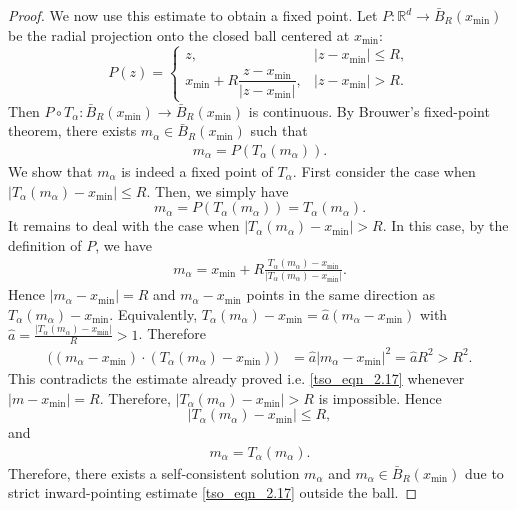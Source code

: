 \documentclass[10pt,a4paper]{amsart}
\begin{document}
\begin{proof}
We now use this estimate to obtain a fixed point. Let
$P:\mathbb R^d\to \bar{B}_R(x_{\min})$ be the radial projection onto
the closed ball centered at $x_{\min}$:
\begin{equation*}
    P(z)
    =
    \begin{cases}
    z, & |z-x_{\min}|\le R,\\
    x_{\min}     +     R\dfrac{z-x_{\min}}{|z-x_{\min}|},
    & |z-x_{\min}|>R.
    \end{cases}
\end{equation*}
Then $ P\circ T_\alpha:
    \bar{B}_R(x_{\min})
    \to     \bar{B}_R(x_{\min}) $ is continuous. By Brouwer's fixed-point theorem, there exists
$m_\alpha\in \bar{B}_R(x_{\min})$ such that
\begin{align*}
    m_\alpha=P(T_\alpha(m_\alpha)).
\end{align*}
We show  that $m_\alpha$ is indeed a fixed point of $T_\alpha$.
First consider the case when $|T_\alpha(m_\alpha)-x_{\min}|\le R$. Then, we simply have 
\begin{equation*}
    m_\alpha = P(T_\alpha(m_\alpha)) =     T_\alpha(m_\alpha).
\end{equation*}
It remains to deal with the case when $|T_\alpha(m_\alpha)-x_{\min}|>R$. 
In this case, by the definition of $P$, we have
\begin{align*}
     m_\alpha
    =  x_{\min} + R\frac{
        T_\alpha(m_\alpha)-x_{\min}}{|T_\alpha(m_\alpha)-x_{\min}|}.
\end{align*}
Hence $|m_\alpha-x_{\min}|=R$ and $m_\alpha-x_{\min}$ points in the same direction as
$T_\alpha(m_\alpha)-x_{\min}$. Equivalently, $T_\alpha(m_\alpha)-x_{\min} = \hat{a}(m_\alpha-x_{\min})$
 with $\hat{a} = \frac{|T_\alpha(m_\alpha)-x_{\min}|}{R} >1$. 
Therefore
\begin{align*}
    \big((m_\alpha-x_{\min})\cdot
    (T_\alpha(m_\alpha)-x_{\min}) \big)  &=
    \hat a |m_\alpha-x_{\min}|^2 = \hat{a} R^2 > R^2.
\end{align*}
This contradicts the estimate already proved i.e. \eqref{tso_eqn_2.17} whenever $|m-x_{\min}|=R$.
Therefore, $|T_\alpha(m_\alpha)-x_{\min}|>R$ is impossible.  Hence 
\begin{equation*}
    |T_\alpha(m_\alpha)-x_{\min}|\leq R,
\end{equation*} and
\begin{align}
    m_\alpha=T_\alpha(m_\alpha).
\end{align}
Therefore, there exists a self-consistent solution $m_\alpha$ and $m_\alpha \in \bar{B}_{R}(x_{\min})$ due to strict inward-pointing estimate \eqref{tso_eqn_2.17} outside the ball.





\end{proof}
\end{document}

